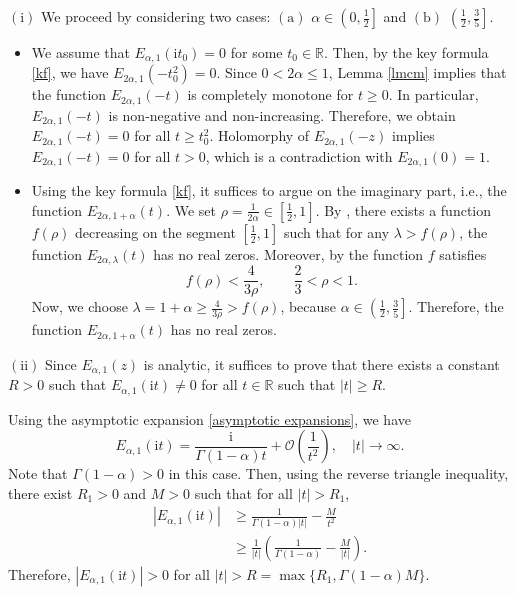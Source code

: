 \documentclass[reqno]{amsart}
\makeatletter
\renewenvironment{proof}[1][\proofname]{\par
  \pushQED{\qed}%
  \normalfont \topsep6\p@\@plus6\p@\relax
  \trivlist
  \item[\hskip\labelsep\bfseries #1\@addpunct{.}]%
}{%
  \popQED\endtrivlist\@endpefalse
}
\numberwithin{equation}{section}
\makeatother
\begin{document}
\begin{proof} $(\mbox{i})$ We proceed by considering two cases: $(\mbox{a})$ $\alpha\in \left(0,\frac{1}{2}\right]$ and $(\mbox{b})$ $\left(\frac{1}{2},\frac{3}{5}\right]$.
\begin{itemize}
    \item[(a)] We assume that $E_{\alpha,1}(\mathrm{i} t_0)=0$ for some $t_0\in\mathbb{R}$. Then, by the key formula \eqref{kf}, we have $E_{2 \alpha,1}\left(-t_0^2\right)=0$. Since $0<2\alpha\le 1$, Lemma \ref{lmcm} implies that the function $E_{2 \alpha,1}\left(-t\right)$ is completely monotone for $t\ge 0$. In particular, $E_{2 \alpha,1}\left(-t\right)$ is non-negative and non-increasing. Therefore, we obtain $E_{2 \alpha,1}\left(-t\right)=0$ for all $t\ge t_0^2$. Holomorphy of $E_{2 \alpha,1}\left(-z\right)$ implies $E_{2 \alpha,1}\left(-t\right)=0$ for all $t> 0$, which is a contradiction with $E_{2 \alpha,1}(0)=1$.
    \item[(b)] Using the key formula \eqref{kf}, it suffices to argue on the imaginary part, i.e., the function $E_{2\alpha,1+\alpha}(t)$. We set $\rho=\frac{1}{2\alpha}\in [\frac{1}{2},1]$. By \cite[Theorem 6.1.1]{PS13}, there exists a function $f(\rho)$ decreasing on the segment $[\frac{1}{2},1]$ such that for any $\lambda > f(\rho)$, the function $E_{2\alpha,\lambda}(t)$ has no real zeros. Moreover, by \cite[Theorem 6.1.3]{PS13} the function $f$ satisfies
$$f(\rho)<\frac{4}{3\rho}, \qquad \frac{2}{3}<\rho<1.$$
Now, we choose $\lambda=1+\alpha\ge\frac{4}{3\rho}>f(\rho)$, because $\alpha\in \left(\frac{1}{2},\frac{3}{5}\right]$. Therefore, the function $E_{2\alpha,1+\alpha}(t)$ has no real zeros.
\end{itemize}
$(\mbox{ii})$ Since $E_{\alpha, 1}(z)$ is analytic, it suffices to prove that there exists a constant $R>0$ such that $E_{\alpha, 1}(\mathrm{i} t)\neq 0$ for all $t\in\mathbb{R}$ such that $|t|\ge R$.

Using the asymptotic expansion \eqref{asymptotic expansions}, we have
$$
E_{\alpha, 1}(\mathrm{i} t)=\frac{\mathrm{i}}{\Gamma(1-\alpha) t} + \mathcal{O}\left(\frac{1}{t^2} \right), \quad |t|\to \infty.
$$
Note that $\Gamma(1-\alpha)>0$ in this case. Then, using the reverse triangle inequality, there exist $R_1>0$ and $M>0$ such that for all $|t| >R_1$, 
\begin{align*}
|E_{\alpha, 1}(\mathrm{i} t)|&\geq \frac{1}{\Gamma(1-\alpha) |t|} -\frac{M}{t^2}\\
&\geq \frac{1}{|t|}\left(\frac{1}{\Gamma(1-\alpha)}-\frac{M}{|t|}\right).
\end{align*}
Therefore, $|E_{\alpha, 1}(\mathrm{i} t)|>0$ for all $|t| > R=\max\{R_1,\Gamma(1-\alpha)M\}$.
\end{proof}
\end{document}
